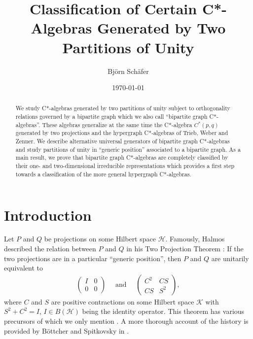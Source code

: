 \documentclass[a4paper]{amsart}
\title[C*-Algebras Generated by Two Partitions of Unity]{Classification of Certain C*-Algebras Generated by Two Partitions of Unity}
\author{Bj\"orn Sch\"afer}
\date{\today}
\begin{document}
\begin{abstract}
    We study C*-algebras generated by two partitions of unity subject to orthogonality relations governed by a bipartite graph which we also call ``bipartite graph C*-algebras''.
    These algebras generalize at the same time the C*-algebra $C^\ast(p,q)$ generated by two projections and the hypergraph C*-algebras of Trieb, Weber and Zenner.
    We describe alternative universal generators of bipartite graph C*-algebras and study partitions of unity in ``generic position'' associated to a bipartite graph.
    As a main result, we prove that bipartite graph C*-algebras are completely classified by their one- and two-dimensional irreducible representations which provides a first step towards a classification of the more general hypergraph C*-algebras.
\end{abstract}

\maketitle

\setcounter{tocdepth}{1}    %
\tableofcontents

\section{Introduction}

Let $P$ and $Q$ be projections on some Hilbert space $\mathcal{H}$. Famously, Halmos described the relation between $P$ and $Q$ in his Two Projection Theorem \cite{halmos_two_1969}:
If the two projections are in a particular ``generic position'',
then $P$ and $Q$ are unitarily equivalent to
\begin{align*}
    \begin{pmatrix}
        I & 0 \\
        0 & 0
    \end{pmatrix}
    \quad \text{ and } \quad
    \begin{pmatrix}
        C^2 & CS \\
        CS & S^2
    \end{pmatrix},
\end{align*}
where $C$ and $S$ are positive contractions on some Hilbert space $\mathcal{K}$ with $S^2 + C^2 = I$, $I \in B(\mathcal{H})$ being the identity operator. This theorem has various precursors of which we only mention \cite{krein_defect_1948, dixmier_position_1948, davis_separation_1958}. A more thorough account of the history is provided by B\"ottcher and Spitkovsky in \cite{bottcher_gentle_2010}.
\end{document}
